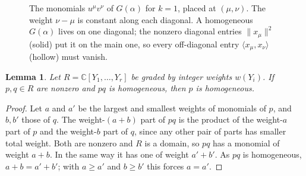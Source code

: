 \documentclass[11pt]{article}
\newtheorem{lemma}[theorem]{Lemma}
\theoremstyle{remark}
\newcommand{\C}{\mathbb{C}}
\newcommand{\ip}[2]{\langle #1,#2\rangle}
\begin{document}
\begin{figure}[ht]
\centering
{}
\caption{The monomials $u^\mu v^\nu$ of $G(\alpha)$ for $k=1$, placed at $(\mu,\nu)$. The weight
$\nu-\mu$ is constant along each diagonal. A homogeneous $G(\alpha)$ lives on one diagonal; the
nonzero diagonal entries $\lVert x_\mu\rVert^2$ (solid) put it on the main one, so every
off-diagonal entry $\ip{x_\mu}{x_\nu}$ (hollow) must vanish.}
\label{fig:diagonals}
\end{figure}

\begin{lemma}\label{lem:graded}
Let $R=\C[Y_1,\dots,Y_r]$ be graded by integer weights $w(Y_i)$. If $p,q\in R$ are nonzero
and $pq$ is homogeneous, then $p$ is homogeneous.
\end{lemma}

\begin{proof}
Let $a$ and $a'$ be the largest and smallest weights of monomials of $p$, and $b,b'$ those of
$q$. The weight-$(a+b)$ part of $pq$ is the product of the weight-$a$ part of $p$ and the
weight-$b$ part of $q$, since any other pair of parts has smaller total weight. Both are
nonzero and $R$ is a domain, so $pq$ has a monomial of weight $a+b$. In the same way it has
one of weight $a'+b'$. As $pq$ is homogeneous, $a+b=a'+b'$; with $a\ge a'$ and $b\ge b'$ this
forces $a=a'$.
\end{proof}
\end{document}
